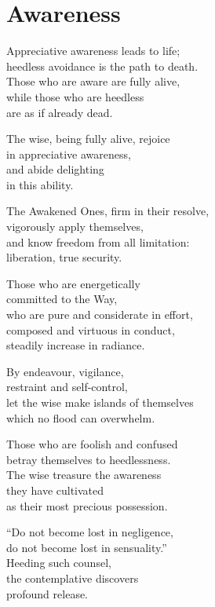 
\chapter{Awareness}

Appreciative awareness leads to life;\\
heedless avoidance is the path to death.\\
Those who are aware are fully alive,\\
while those who are heedless\\
are as if already dead.

The wise, being fully alive, rejoice\\
in appreciative awareness,\\
and abide delighting\\
in this ability.


The Awakened Ones, firm in their resolve,\\
vigorously apply themselves,\\
and know freedom from all limitation:\\
liberation, true security.


Those who are energetically\\
committed to the Way,\\
who are pure and considerate in effort,\\
composed and virtuous in conduct,\\
steadily increase in radiance.


By endeavour, vigilance,\\
restraint and self-control,\\
let the wise make islands of themselves\\
which no flood can overwhelm.



Those who are foolish and confused\\
betray themselves to heedlessness.\\
The wise treasure the awareness\\
they have cultivated\\
as their most precious possession.


“Do not become lost in negligence,\\
do not become lost in sensuality.”\\
Heeding such counsel,\\
the contemplative discovers\\
profound release.

